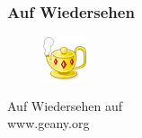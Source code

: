 
%

\frame{\titlepage}
\frame{\tableofcontents}











\begin{frame}[plain]
	\frametitle{Auf Wiedersehen}
	\begin{figure}[ht]
		\includegraphics{../../img/geany.png}
	\end{figure}

	\begin{center}
	\huge Auf Wiedersehen auf \\ www.geany.org
	\end{center}
\end{frame}



